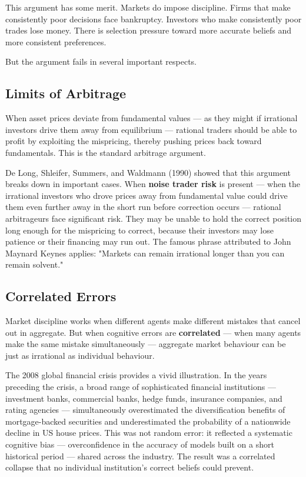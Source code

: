 \documentclass[12pt, letterpaper]{article}
\begin{document}
This argument has some merit. Markets do impose discipline. Firms that make consistently poor decisions face bankruptcy. Investors who make consistently poor trades lose money. There is selection pressure toward more accurate beliefs and more consistent preferences.

But the argument fails in several important respects.


\subsection{Limits of Arbitrage}


When asset prices deviate from fundamental values --- as they might if irrational investors drive them away from equilibrium --- rational traders should be able to profit by exploiting the mispricing, thereby pushing prices back toward fundamentals. This is the standard arbitrage argument.

De Long, Shleifer, Summers, and Waldmann (1990) showed that this argument breaks down in important cases. When \textbf{noise trader risk} is present --- when the irrational investors who drove prices away from fundamental value could drive them even further away in the short run before correction occurs --- rational arbitrageurs face significant risk. They may be unable to hold the correct position long enough for the mispricing to correct, because their investors may lose patience or their financing may run out. The famous phrase attributed to John Maynard Keynes applies: "Markets can remain irrational longer than you can remain solvent."


\subsection{Correlated Errors}


Market discipline works when different agents make different mistakes that cancel out in aggregate. But when cognitive errors are \textbf{correlated} --- when many agents make the same mistake simultaneously --- aggregate market behaviour can be just as irrational as individual behaviour.

The 2008 global financial crisis provides a vivid illustration. In the years preceding the crisis, a broad range of sophisticated financial institutions --- investment banks, commercial banks, hedge funds, insurance companies, and rating agencies --- simultaneously overestimated the diversification benefits of mortgage-backed securities and underestimated the probability of a nationwide decline in US house prices. This was not random error: it reflected a systematic cognitive bias --- overconfidence in the accuracy of models built on a short historical period --- shared across the industry. The result was a correlated collapse that no individual institution's correct beliefs could prevent.
\end{document}
